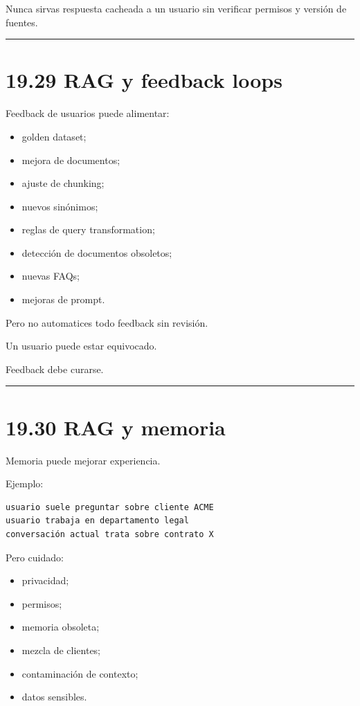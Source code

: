 Nunca sirvas respuesta cacheada a un usuario sin verificar permisos y
versión de fuentes.

\begin{center}\rule{0.5\linewidth}{0.5pt}\end{center}

\section{19.29 RAG y feedback loops}\label{rag-y-feedback-loops}

Feedback de usuarios puede alimentar:

\begin{itemize}
\tightlist
\item
  golden dataset;
\item
  mejora de documentos;
\item
  ajuste de chunking;
\item
  nuevos sinónimos;
\item
  reglas de query transformation;
\item
  detección de documentos obsoletos;
\item
  nuevas FAQs;
\item
  mejoras de prompt.
\end{itemize}

Pero no automatices todo feedback sin revisión.

Un usuario puede estar equivocado.

Feedback debe curarse.

\begin{center}\rule{0.5\linewidth}{0.5pt}\end{center}

\section{19.30 RAG y memoria}\label{rag-y-memoria}

Memoria puede mejorar experiencia.

Ejemplo:

\begin{lstlisting}
usuario suele preguntar sobre cliente ACME
usuario trabaja en departamento legal
conversación actual trata sobre contrato X
\end{lstlisting}

Pero cuidado:

\begin{itemize}
\tightlist
\item
  privacidad;
\item
  permisos;
\item
  memoria obsoleta;
\item
  mezcla de clientes;
\item
  contaminación de contexto;
\item
  datos sensibles.
\end{itemize}


